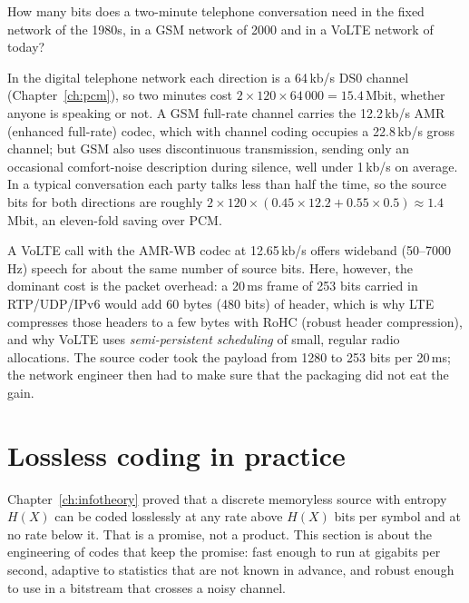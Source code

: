 \begin{worked}
How many bits does a two-minute telephone conversation need in the fixed network of the 1980s,
in a GSM network of 2000 and in a VoLTE network of today?

In the digital telephone network each direction is a 64\,kb/s DS0 channel (Chapter~\ref{ch:pcm}),
so two minutes cost $2\times120\times64\,000=15.4$\,Mbit, whether anyone is speaking or not. A GSM
full-rate channel carries the 12.2\,kb/s AMR (enhanced full-rate) codec, which with channel coding
occupies a 22.8\,kb/s gross channel; but GSM also uses discontinuous transmission, sending only an
occasional comfort-noise description during silence, well under 1\,kb/s on average. In a typical
conversation each party talks less than half the time, so the source bits for both directions are
roughly $2\times120\times(0.45\times12.2+0.55\times0.5)\approx1.4$\,Mbit, an eleven-fold saving over
PCM.

A VoLTE call with the AMR-WB codec at 12.65\,kb/s offers wideband (50--7000\,Hz) speech for about
the same number of source bits. Here, however, the dominant cost is the packet overhead: a 20\,ms
frame of 253 bits carried in RTP/UDP/IPv6 would add 60 bytes (480 bits) of header, which is why LTE
compresses those headers to a few bytes with RoHC (robust header compression), and why VoLTE uses
\emph{semi-persistent scheduling} of small, regular radio allocations. The source coder took the
payload from 1280 to 253 bits per 20\,ms; the network engineer then had to make sure that the
packaging did not eat the gain.
\end{worked}

\section{Lossless coding in practice}
\label{sec:ch16:lossless}

Chapter~\ref{ch:infotheory} proved that a discrete memoryless source with entropy $H(X)$ can be
coded losslessly at any rate above $H(X)$ bits per symbol and at no rate below it. That is a
promise, not a product. This section is about the engineering of codes that keep the promise:
fast enough to run at gigabits per second, adaptive to statistics that are not known in advance,
and robust enough to use in a bitstream that crosses a noisy channel.

